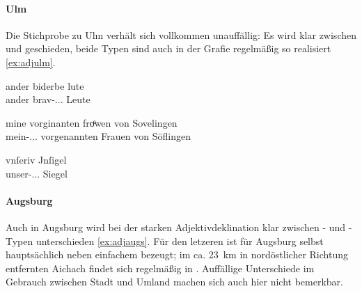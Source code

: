 \paragraph{Ulm}
\label{par:adjulm}
Die Stichprobe zu Ulm verhält sich vollkommen unauffällig: Es wird klar
zwischen  und  geschieden, beide Typen sind auch in der
Grafie regelmäßig so realisiert \cref{ex:adjulm}.

\begin{exe}
\ex \label{ex:adjulm}
	\begin{xlist}
	\ex \label{ex:adjulm_1}
		\gll ander biderbe lute \\
			ander brav-\Nom.\Pl.\MascX.\St{} Leute \\
		\begin{taggedline}{\parencites(Ulm, 1299)[\pno~3308, 455.44]{cao4}}
		\trans {}
		\end{taggedline}

	\ex \label{ex:adjulm_2}
		\gll mine vorginanten froͤwen von Sovelingen \\
			mein-\Nom.\Pl.\FemF.\St{} vorgenannten Frauen von Söflingen \\
		\begin{taggedline}{\parencites(Ulm, 1296)[\pno~2467, 526.36]{cao3}}
		\trans {}
		\end{taggedline}

	\ex \label{ex:adjulm_3}
		\gll vnſeriv Jnſigel \\
			unser-\Acc.\Pl.\NeutI.\St{} Siegel \\
		\begin{taggedline}{\parencites(Ulm, 1293)[\pno~1662, 3.12--13]{cao3}}
		\trans {}
		\end{taggedline}
	\end{xlist}
\end{exe}

\paragraph{Augsburg}
\label{par:adjaugsburg}
Auch in Augsburg wird bei der starken Adjektivdeklination klar zwischen
- und -Typen unterschieden \cref{ex:adjaugs}. Für den letzeren
ist für Augsburg selbst hauptsächlich  neben einfachem 
bezeugt; im ca. 23~km in nordöstlicher Richtung entfernten Aichach findet sich
regelmäßig  in  . Auffällige Unterschiede im
Gebrauch zwischen Stadt und Umland machen sich auch hier nicht bemerkbar.


